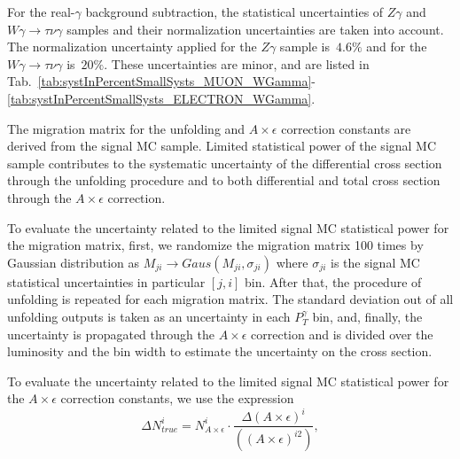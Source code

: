 
For the real-$\gamma$ background subtraction, the statistical uncertainties of $Z\gamma$ and $W\gamma\rightarrow\tau\nu\gamma$ samples and their normalization uncertainties are taken into account. The normalization uncertainty applied for the $Z\gamma$ sample is~$4.6\%$ and for the $W\gamma\rightarrow\tau\nu\gamma$ is~$20\%$. These uncertainties are minor, and are listed in Tab.~\ref{tab:systInPercentSmallSysts_MUON_WGamma}-\ref{tab:systInPercentSmallSysts_ELECTRON_WGamma}.


The migration matrix for the unfolding and $A\times\epsilon$ correction constants are derived from the signal MC sample. Limited statistical power of the signal MC sample contributes to the systematic uncertainty of the differential cross section through the unfolding procedure and to both differential and total cross section through the  $A\times\epsilon$ correction. 

To evaluate the uncertainty related to the limited signal MC statistical power for the migration matrix, first, we randomize the migration matrix 100 times by Gaussian distribution as $M_{ji}\rightarrow Gaus(M_{ji},\sigma_{ji})$ where $\sigma_{ji}$ is the signal MC statistical uncertainties in particular $[j,i]$ bin. After that, the procedure of unfolding is repeated for each migration matrix. The standard deviation out of all unfolding outputs is taken as an uncertainty in each $P_T^{\gamma}$ bin, and, finally, the uncertainty is propagated through the $A\times\epsilon$ correction and is divided over the luminosity and the bin width to estimate the uncertainty on the cross section.

To evaluate the uncertainty related to the limited signal MC statistical power for the $A \times \epsilon$ correction constants, we use the expression
\begin{equation}
\Delta N_{true}^i= N_{A\times \epsilon}^i \cdot \frac{\Delta{(A\times \epsilon)^i}} { ((A\times \epsilon)^{i2})}, 
\end{equation}

